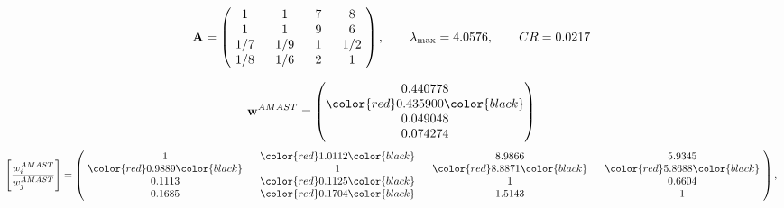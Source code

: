 \begin{example}
\begin{equation*}
\mathbf{A} =
\begin{pmatrix}
$\,\,$ 1 $\,\,$ & $\,\,$1$\,\,$ & $\,\,$7$\,\,$ & $\,\,$8 $\,\,$ \\
$\,\,$ 1 $\,\,$ & $\,\,$ 1 $\,\,$ & $\,\,$9$\,\,$ & $\,\,$6 $\,\,$ \\
$\,\,$ 1/7$\,\,$ & $\,\,$ 1/9$\,\,$ & $\,\,$ 1 $\,\,$ & $\,\,$ 1/2 $\,\,$ \\
$\,\,$ 1/8$\,\,$ & $\,\,$ 1/6$\,\,$ & $\,\,$2$\,\,$ & $\,\,$ 1  $\,\,$ \\
\end{pmatrix},
\qquad
\lambda_{\max} =
4.0576,
\qquad
CR = 0.0217
\end{equation*}

\begin{equation*}
\mathbf{w}^{AMAST} =
\begin{pmatrix}
0.440778\\
\color{red} 0.435900\color{black} \\
0.049048\\
0.074274
\end{pmatrix}\end{equation*}
\begin{equation*}
\left[ \frac{{w}^{AMAST}_i}{{w}^{AMAST}_j} \right] =
\begin{pmatrix}
$\,\,$ 1 $\,\,$ & $\,\,$\color{red} 1.0112\color{black} $\,\,$ & $\,\,$8.9866$\,\,$ & $\,\,$5.9345$\,\,$ \\
$\,\,$\color{red} 0.9889\color{black} $\,\,$ & $\,\,$ 1 $\,\,$ & $\,\,$\color{red} 8.8871\color{black} $\,\,$ & $\,\,$\color{red} 5.8688\color{black}   $\,\,$ \\
$\,\,$0.1113$\,\,$ & $\,\,$\color{red} 0.1125\color{black} $\,\,$ & $\,\,$ 1 $\,\,$ & $\,\,$0.6604 $\,\,$ \\
$\,\,$0.1685$\,\,$ & $\,\,$\color{red} 0.1704\color{black} $\,\,$ & $\,\,$1.5143$\,\,$ & $\,\,$ 1  $\,\,$ \\
\end{pmatrix},
\end{equation*}


\end{example}
